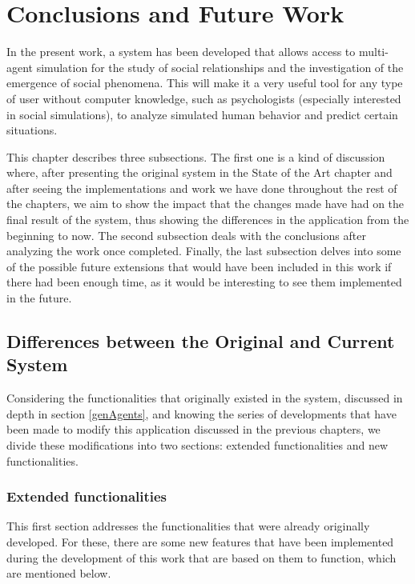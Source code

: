 \chapter*{Conclusions and Future Work}
\label{cap:conclusions}

In the present work, a system has been developed that allows access to multi-agent simulation for the study of social relationships and the investigation of the emergence of social phenomena. This will make it a very useful tool for any type of user without computer knowledge, such as psychologists (especially interested in social simulations), to analyze simulated human behavior and predict certain situations.

This chapter describes three subsections. The first one is a kind of discussion where, after presenting the original system in the State of the Art chapter and after seeing the implementations and work we have done throughout the rest of the chapters, we aim to show the impact that the changes made have had on the final result of the system, thus showing the differences in the application from the beginning to now. The second subsection deals with the conclusions after analyzing the work once completed. Finally, the last subsection delves into some of the possible future extensions that would have been included in this work if there had been enough time, as it would be interesting to see them implemented in the future.

\section{Differences between the Original and Current System}

Considering the functionalities that originally existed in the system, discussed in depth in section \ref{genAgents}, and knowing the series of developments that have been made to modify this application discussed in the previous chapters, we divide these modifications into two sections: extended functionalities and new functionalities.

\subsection{Extended functionalities}
This first section addresses the functionalities that were already originally developed. For these, there are some new features that have been implemented during the development of this work that are based on them to function, which are mentioned below.

